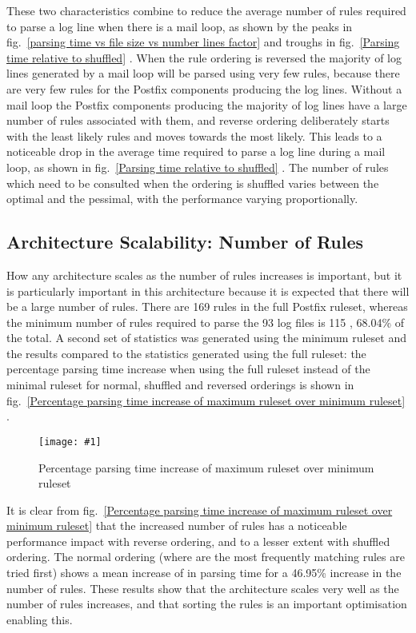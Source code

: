 \documentclass[draft]{svmult}
\newcommand{\showgraph}[3]{%
    \begin{figure}[hbt!]%
        \caption{#2}\label{#3}%
        \texttt{[image: \#1]}%
    \end{figure}%
}
\newcommand{\refwithlabel}[2]{%
    #1~\vref{#2}%
}
\newcommand{\graphref}[1]{%
    \refwithlabel{fig.}{#1}%
}
\newcommand{\numberOFlogFILES}[0]{%
    93%
}
\newcommand{\numberOFrules}[0]{%
    169%
}
\newcommand{\numberOFrulesMINIMUM}[0]{%
    115%
}
\newcommand{\numberOFrulesMINIMUMpercentage}[0]{%
    68.04\%%
}
\newcommand{\numberOFrulesMAXIMUMpercentage}[0]{%
    46.95\%%
}
\begin{document}
\newpage

These two characteristics combine to reduce the average number of rules
required to parse a log line when there is a mail loop, as shown by the
peaks in \graphref{parsing time vs file size vs number lines factor} and
troughs in \graphref{Parsing time relative to shuffled}.  When the rule
ordering is reversed the majority of log lines generated by a mail loop
will be parsed using very few rules, because there are very few rules for
the Postfix components producing the log lines.  Without a mail loop the
Postfix components producing the majority of log lines have a large number
of rules associated with them, and reverse ordering deliberately starts
with the least likely rules and moves towards the most likely.  This leads
to a noticeable drop in the average time required to parse a log line
during a mail loop, as shown in \graphref{Parsing time relative to
shuffled}.  The number of rules which need to be consulted when the
ordering is shuffled varies between the optimal and the pessimal, with the
performance varying proportionally.

\subsection{Architecture Scalability: Number of Rules}

How any architecture scales as the number of rules increases is important,
but it is particularly important in this architecture because it is
expected that there will be a large number of rules.  There are
\numberOFrules{} rules in the full Postfix ruleset, whereas the minimum
number of rules required to parse the \numberOFlogFILES{} log files is
\numberOFrulesMINIMUM{}, \numberOFrulesMINIMUMpercentage{} of the total.  A
second set of statistics was generated using the minimum ruleset and the
results compared to the statistics generated using the full ruleset: the
percentage parsing time increase when using the full ruleset instead of the
minimal ruleset for normal, shuffled and reversed orderings is shown in
\graphref{Percentage parsing time increase of maximum ruleset over minimum
ruleset}.
\showgraph{build/graph-full-ruleset-vs-minimum-ruleset}{Percentage parsing
time increase of maximum ruleset over minimum ruleset}{Percentage parsing
time increase of maximum ruleset over minimum ruleset}

It is clear from \graphref{Percentage parsing time increase of maximum
ruleset over minimum ruleset} that the increased number of rules has a
noticeable performance impact with reverse ordering, and to a lesser extent
with shuffled ordering.  The normal ordering (where are the most frequently
matching rules are tried first) shows a mean increase of
 in parsing time for a
\numberOFrulesMAXIMUMpercentage{} increase in the number of rules.  These
results show that the architecture scales very well as the number of rules
increases, and that sorting the rules is an important optimisation enabling
this.
\end{document}
